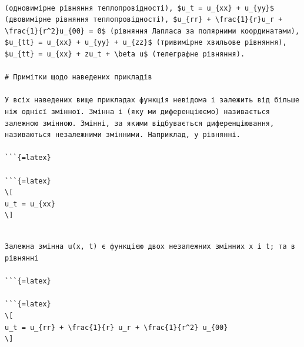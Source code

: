 \documentclass[
  ukrainian,
]{article}
\begin{document}
\begin{verbatim}

(одновимірне рівняння теплопровідності), $u_t = u_{xx} + u_{yy}$ (двовимірне рівняння теплопровідності), $u_{rr} + \frac{1}{r}u_r + \frac{1}{r^2}u_{00} = 0$ (рівняння Лапласа за полярними координатами), $u_{tt} = u_{xx} + u_{yy} + u_{zz}$ (тривимірне хвильове рівняння), $u_{tt} = u_{xx} + zu_t + \beta u$ (телеграфне рівняння).

# Примітки щодо наведених прикладів

У всіх наведених вище прикладах функція невідома і залежить від більше ніж однієї змінної. Змінна і (яку ми диференціюємо) називається залежною змінною. Змінні, за якими відбувається диференціювання, називаються незалежними змінними. Наприклад, у рівнянні.

```{=latex}

```{=latex}
\[
u_t = u_{xx}
\]
\end{verbatim}

\begin{verbatim}

Залежна змінна u(x, t) є функцією двох незалежних змінних x і t; та в рівнянні

```{=latex}

```{=latex}
\[
u_t = u_{rr} + \frac{1}{r} u_r + \frac{1}{r^2} u_{00}
\]
\end{verbatim}
\end{document}
